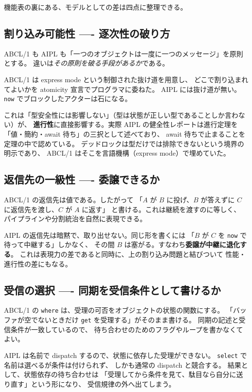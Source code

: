 \documentclass[11pt,a4paper]{ltjsarticle}
\theoremstyle{remark}
\begin{document}
機能表の裏にある、モデルとしての差は四点に整理できる。

\subsection{割り込み可能性 ---- 逐次性の破り方}

ABCL/1 も AIPL も「一つのオブジェクトは一度に一つのメッセージ」を原則とする。
違いは\emph{その原則を破る手段があるか}である。

ABCL/1 は express mode という制御された抜け道を用意し、
どこで割り込まれてよいかを atomicity 宣言でプログラマに委ねた。
AIPL には抜け道が無い。\texttt{now} でブロックしたアクターは石になる。

これは「型安全性には影響しない」（型は状態が正しい型であることしか言わない）が、
\textbf{進行性}に直接影響する。実際 AIPL の健全性レポートは進行定理を
「値・簡約・await 待ち」の三択として述べており、
await 待ちで止まることを定理の中で認めている。
デッドロックは型だけでは排除できないという境界の明示であり、
ABCL/1 はそこを言語機構（express mode）で埋めていた。

\subsection{返信先の一級性 ---- 委譲できるか}

ABCL/1 の返信先は値である。したがって
「$A$ が $B$ に投げ、$B$ が答えずに $C$ に返信先を渡し、$C$ が $A$ に返す」
と書ける。これは継続を渡すのに等しく、
パイプラインや分割統治を自然に表現できる。

AIPL の返信先は暗黙で、取り出せない。同じ形を書くには
「$B$ が $C$ を \texttt{now} で待って中継する」しかなく、
その間 $B$ は塞がる。すなわち\textbf{委譲が中継に退化する}。
これは表現力の差であると同時に、上の割り込み問題と結びついて
性能・進行性の差にもなる。

\subsection{受信の選択 ---- 同期を受信条件として書けるか}

ABCL/1 の \texttt{where} は、受理の可否をオブジェクトの状態の関数にする。
「バッファが空でないときだけ \texttt{get} を受理する」がそのまま書ける。
同期の記述と受信条件が一致しているので、
待ち合わせのためのフラグやループを書かなくてよい。

AIPL は名前で dispatch するので、状態に依存した受理ができない。
\texttt{select} で名前は選べるが条件は付けられず、
しかも通常の dispatch と競合する。
結果として、状態依存の待ち合わせは
「受理してから条件を見て、駄目なら自分に送り直す」という形になり、
受信規律の外へ出てしまう。
\end{document}
